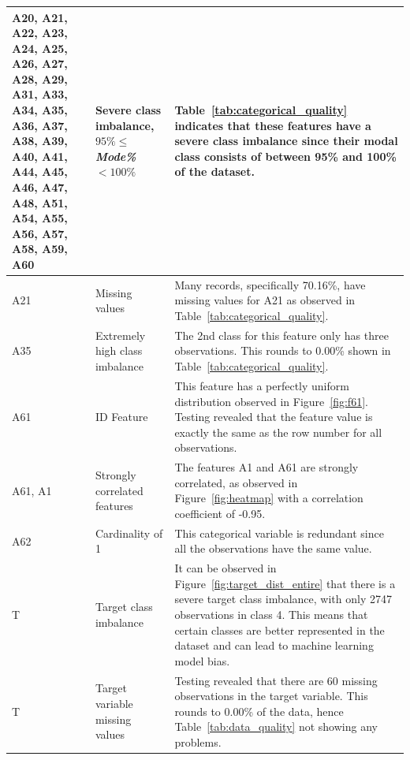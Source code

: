 \documentclass[11pt]{article}
\begin{document}
\begin{longtable}{|p{1.7cm}|p{4cm}|p{8cm}|}
	\hline
	A20, A21, A22, A23, A24, A25, A26, A27, A28, A29, A31, A33, A34, A35, A36, A37, A38, A39, A40, A41, A44, A45, A46, A47, A48, A51, A54, A55, A56, A57, A58, A59, A60 & Severe class imbalance, $95\%\le$\textit{Mode\%} $< 100\%$ & Table~\ref{tab:categorical_quality} indicates that these features have a severe class imbalance since their modal class consists of between 95\% and 100\% of the dataset. \\
	\hline
	A21 & Missing values & Many records, specifically 70.16\%, have missing values for A21 as observed in Table~\ref{tab:categorical_quality}. \\
	\hline
	A35 & Extremely high class imbalance& The 2nd class for this feature only has three observations. This rounds to 0.00\% shown in Table~\ref{tab:categorical_quality}. \\
	\hline
	A61 & ID Feature & This feature has a perfectly uniform distribution observed in Figure~\ref{fig:f61}. Testing revealed that the feature value is exactly the same as the row number for all observations. \\
	\hline
	A61, A1 & Strongly correlated features & The features A1 and A61 are strongly correlated, as observed in Figure~\ref{fig:heatmap} with a correlation coefficient of -0.95. \\
	\hline
	A62 & Cardinality of 1 & This categorical variable is redundant since all the observations have the same value. \\
	\hline
	T & Target class imbalance &  It can be observed in Figure~\ref{fig:target_dist_entire} that there is a severe target class imbalance, with only 2747 observations in class 4.  This means that certain classes are better represented in the dataset and can lead to machine learning model bias. \\
	\hline
	T & Target variable missing values & Testing revealed that there are 60 missing observations in the target variable. This rounds to 0.00\% of the data, hence Table~\ref{tab:data_quality} not showing any problems.\\
	\hline
\end{longtable}
\end{document}
